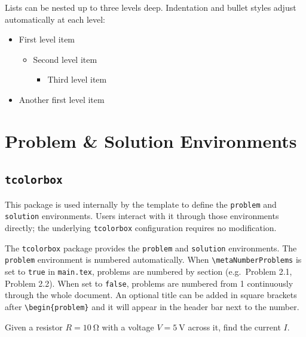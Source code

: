 	Lists can be nested up to three levels deep. Indentation and bullet styles adjust automatically at each level:
	
	\begin{itemize}
		\item First level item
		\begin{itemize}[noitemsep]
			\item Second level item
			\begin{itemize}[noitemsep]
				\item Third level item
			\end{itemize}
		\end{itemize}
		\item Another first level item
	\end{itemize}

\section{Problem \& Solution Environments}

	\subsection{\texttt{tcolorbox}}
	\noindent\colorbox{themecolour!15}{\parbox{\linewidth}{\small This package is used internally by the template to define the \texttt{problem} and \texttt{solution} environments. Users interact with it through those environments directly; the underlying \texttt{tcolorbox} configuration requires no modification.}}\vspace{0.5\baselineskip}
	
	The \texttt{tcolorbox} package provides the \texttt{problem} and \texttt{solution} environments. The \texttt{problem} environment is numbered automatically. When \texttt{\textbackslash metaNumberProblems} is set to \texttt{true} in \texttt{main.tex}, problems are numbered by section (e.g.\ Problem 2.1, Problem 2.2). When set to \texttt{false}, problems are numbered from 1 continuously through the whole document. An optional title can be added in square brackets after \texttt{\textbackslash begin\{problem\}} and it will appear in the header bar next to the number.
	
	\begin{problem}
		\label{prob:ohmslaw}
		Given a resistor $R = \SI{10}{\ohm}$ with a voltage $V = \SI{5}{\volt}$ across it,
		find the current $I$.
	\end{problem}
	
